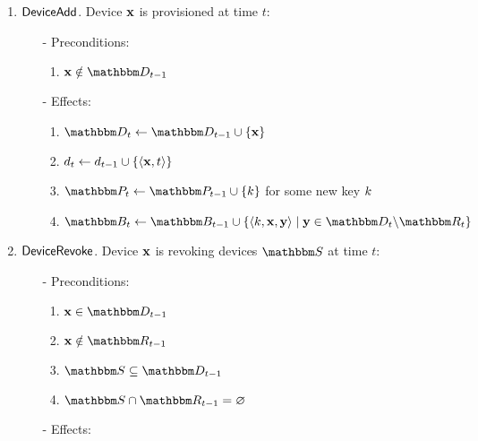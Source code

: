 \begin{definition}
\begin{enumerate}
\item $\mathsf{DeviceAdd}{}$. Device $\mathbf{x}$ is provisioned at time $t$:
 \begin{itemize}
   \item[-] Preconditions:
    \begin{enumerate}
     \item $\zdev{x} \notin \zset{d}_{t-1}$
    \end{enumerate}
   \item[-] Effects:
    \begin{enumerate}
      \item $\zset{d}_t \leftarrow \zset{d}_{t-1} \cup \left\{ \zdev{x} \right\}$
      \item $d_t \leftarrow d_{t-1} \cup \left\{ \langle \mathbf{x}, t \rangle
        \right\}$
      \item $\zset{P}_t \leftarrow \zset{p}_{t-1} \cup \left\{ \zkey{k} \right\}$ for some new key
      ${k}$
        \label{e:prov:newpuk}
        \item $\zset{b}_t \leftarrow \zset{b}_{t-1} \cup \left\{ \langle \zkey{k}, \zdev{x},
        \zdev{y} \rangle \;|\; \zdev{y} \in \zset{d}_t \setsub \zset{r}_t \right\}$
          \label{e:prov:box}
    \end{enumerate}
 \end{itemize}
\item $\mathsf{DeviceRevoke}{}$. Device $\mathbf{x}$ is revoking devices $\zset{S}$ at time $t$:
    \begin{itemize}
      \item[-] Preconditions:
      \begin{enumerate}
        \item $\zdev{x} \in \zset{d}_{t-1}$
        \item $\zdev{x} \notin \zset{r}_{t-1}$
        \item $\zset{s} \subseteq \zset{d}_{t-1}$
        \item $\zset{s} \cap \zset{r}_{t-1} = \varnothing$
      \end{enumerate}
      \item[-] Effects:
\end{itemize}
\end{enumerate}
\end{definition}
